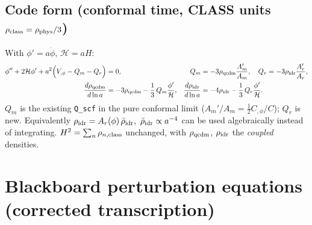\documentclass[11pt]{article}
\newcommand{\rhob}{\bar\rho}
\newcommand{\Am}{A_{m}}
\newcommand{\Ar}{A_{r}}
\newcommand{\cH}{\mathcal{H}}
\begin{document}
\subsection*{Code form (conformal time, CLASS units $\rho_{\rm class}=\rho_{\rm phys}/3$)}

With $\phi'=a\dot\phi$, $\cH=aH$:
\begin{align}
\phi''+2\cH\phi'+a^2\Big(V_{,\phi}-Q_m-Q_r\Big)&=0 ,
&Q_m&=-3\rho_{\rm qcdm}\frac{\Am'}{\Am}, \quad
Q_r=-3\rho_{\rm idr}\frac{\Ar'}{\Ar},
\\
\frac{d\rho_{\rm qcdm}}{d\ln a}&=-3\rho_{\rm qcdm}-\frac{1}{3}\,Q_m\frac{\phi'}{\cH},
&\frac{d\rho_{\rm idr}}{d\ln a}&=-4\rho_{\rm idr}-\frac{1}{3}\,Q_r\frac{\phi'}{\cH}.
\end{align}
$Q_m$ is the existing \texttt{Q\_scf} in the pure conformal limit
($\Am'/\Am=\tfrac12C_{,\phi}/C$); $Q_r$ is new. Equivalently
$\rho_{\rm idr}=\Ar(\phi)\,\rhob_{\rm idr},\ \rhob_{\rm idr}\propto a^{-4}$ can be used
algebraically instead of integrating. $H^2=\sum_n\rho_{n,\rm class}$ unchanged,
with $\rho_{\rm qcdm}$, $\rho_{\rm idr}$ the \emph{coupled} densities.

\section{Blackboard perturbation equations (corrected transcription)}
\end{document}
